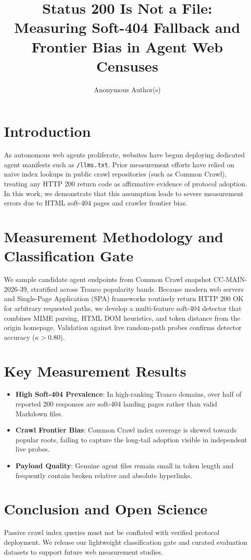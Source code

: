 \documentclass[sigconf,anonymous,review]{acmart}
\title{Status 200 Is Not a File: Measuring Soft-404 Fallback and Frontier Bias in Agent Web Censuses}
\author{Anonymous Author(s)}
\affiliation{%
  \institution{Anonymous Institution}
  \country{Anonymous Country}
}
\begin{document}
\maketitle

\section{Introduction}
As autonomous web agents proliferate, websites have begun deploying dedicated agent manifests such as \texttt{/llms.txt}. Prior measurement efforts have relied on naive index lookups in public crawl repositories (such as Common Crawl), treating any HTTP 200 return code as affirmative evidence of protocol adoption. In this work, we demonstrate that this assumption leads to severe measurement errors due to HTML soft-404 pages and crawler frontier bias.

\section{Measurement Methodology and Classification Gate}
We sample candidate agent endpoints from Common Crawl snapshot CC-MAIN-2026-39, stratified across Tranco popularity bands. Because modern web servers and Single-Page Application (SPA) frameworks routinely return HTTP 200 OK for arbitrary requested paths, we develop a multi-feature soft-404 detector that combines MIME parsing, HTML DOM heuristics, and token distance from the origin homepage. Validation against live random-path probes confirms detector accuracy ($\kappa > 0.80$).

\section{Key Measurement Results}
\begin{itemize}
    \item \textbf{High Soft-404 Prevalence}: In high-ranking Tranco domains, over half of reported 200 responses are soft-404 landing pages rather than valid Markdown files.
    \item \textbf{Crawl Frontier Bias}: Common Crawl index coverage is skewed towards popular roots, failing to capture the long-tail adoption visible in independent live probes.
    \item \textbf{Payload Quality}: Genuine agent files remain small in token length and frequently contain broken relative and absolute hyperlinks.
\end{itemize}

\section{Conclusion and Open Science}
Passive crawl index queries must not be conflated with verified protocol deployment. We release our lightweight classification gate and curated evaluation datasets to support future web measurement studies.



\end{document}
